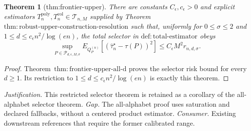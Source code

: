 \documentclass{article}
\newtheorem{theorem}{Theorem}
\begin{document}
\begin{theorem}[thm:frontier-upper]\label{thm:frontier-upper}
There are constants \(C_{\epsilon},c_{\epsilon}>0\) and explicit estimators \(T_n^{\mathrm{poly}},T_n^{\mathrm{col}}\in\mathcal T_{n,M}\) supplied by Theorem~\(\mathrm{thm:robust\text{-}upper\text{-}construction\text{-}resolution}\) such that, uniformly for \(0\le\sigma\le2\) and \(1\le d\le c_{\epsilon}n^2/\log(en)\), the total selector in \(\mathrm{def:total\text{-}estimator}\) obeys \[\sup_{P\in\mathcal P_{d,\epsilon,M,\sigma}}E_{Q_P^{(n)}}[(\widehat\tau_n^{\star}-\tau(P))^2]\le C_{\epsilon}M^2r_{n,d,\sigma}.\]
\end{theorem}
\begin{proof}
Theorem~\(\mathrm{thm:frontier\text{-}upper\text{-}all\text{-}d}\) proves the selector risk bound for every \(d\ge1\).  Its restriction to \(1\le d\le c_{\epsilon}n^2/\log(en)\) is exactly this theorem.
\end{proof}
\par\smallskip\noindent \textit{Justification.} This restricted selector theorem is retained as a corollary of the all-alphabet selector theorem. \textit{Gap.} The all-alphabet proof uses saturation and declared fallbacks, without a centered product estimator. \textit{Consumer.} Existing downstream references that require the former calibrated range.
\end{document}

